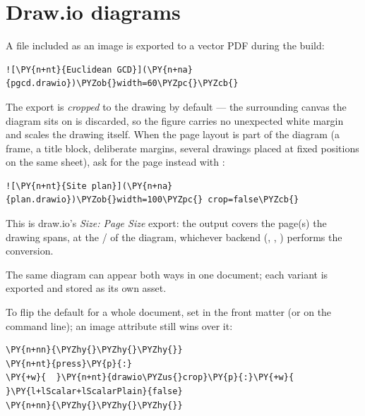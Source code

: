 \documentclass[a4paper,twoside]{article}
\begin{document}
\section{Draw.io diagrams}
A  file included as an image is exported to a vector PDF during the
build:
\begin{tscode}[lang=md, engine=pygments]
\begin{Verbatim}[commandchars=\\\{\},breaklines, breakanywhere, commandchars=\\\{\}]
![\PY{n+nt}{Euclidean GCD}](\PY{n+na}{pgcd.drawio})\PYZob{}width=60\PYZpc{}\PYZcb{}
\end{Verbatim}
\end{tscode}
The export is \emph{cropped} to the drawing by default --- the surrounding canvas the
diagram sits on is discarded, so the figure carries no unexpected white margin
and  scales the drawing itself. When the page layout is part of the
diagram (a frame, a title block, deliberate margins, several drawings placed at
fixed positions on the same sheet), ask for the page instead with :
\begin{tscode}[lang=md, engine=pygments]
\begin{Verbatim}[commandchars=\\\{\},breaklines, breakanywhere, commandchars=\\\{\}]
![\PY{n+nt}{Site plan}](\PY{n+na}{plan.drawio})\PYZob{}width=100\PYZpc{} crop=false\PYZcb{}
\end{Verbatim}
\end{tscode}
This is draw.io's \emph{Size: Page Size} export: the output covers the page(s) the
drawing spans, at the  /  of the diagram, whichever
backend (, , ) performs the conversion.

The same diagram can appear both ways in one document; each variant is exported
and stored as its own asset.

To flip the default for a whole document, set  in the front matter
(or  on the command line); an image
attribute still wins over it:
\begin{tscode}[lang=yaml, engine=pygments]
\begin{Verbatim}[commandchars=\\\{\},breaklines, breakanywhere, commandchars=\\\{\}]
\PY{n+nn}{\PYZhy{}\PYZhy{}\PYZhy{}}
\PY{n+nt}{press}\PY{p}{:}
\PY{+w}{  }\PY{n+nt}{drawio\PYZus{}crop}\PY{p}{:}\PY{+w}{ }\PY{l+lScalar+lScalarPlain}{false}
\PY{n+nn}{\PYZhy{}\PYZhy{}\PYZhy{}}
\end{Verbatim}
\end{tscode}
\end{document}
